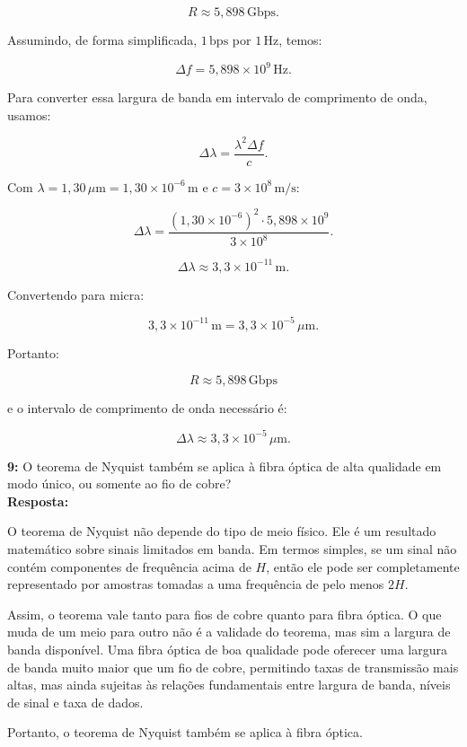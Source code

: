 \documentclass[12pt,a4paper]{report}
\begin{document}
\[
R \approx 5{,}898\,\text{Gbps}.
\]

Assumindo, de forma simplificada, $1\,\text{bps}$ por $1\,\text{Hz}$, temos:

\[
\Delta f = 5{,}898 \times 10^9\,\text{Hz}.
\]

Para converter essa largura de banda em intervalo de comprimento de onda, usamos:

\[
\Delta \lambda = \frac{\lambda^2\Delta f}{c}.
\]

Com $\lambda = 1{,}30\,\mu\text{m} = 1{,}30 \times 10^{-6}\,\text{m}$ e $c = 3 \times 10^8\,\text{m/s}$:

\[
\Delta \lambda = \frac{(1{,}30 \times 10^{-6})^2 \cdot 5{,}898 \times 10^9}{3 \times 10^8}.
\]

\[
\Delta \lambda \approx 3{,}3 \times 10^{-11}\,\text{m}.
\]

Convertendo para micra:

\[
3{,}3 \times 10^{-11}\,\text{m} = 3{,}3 \times 10^{-5}\,\mu\text{m}.
\]

Portanto:

\[
\boxed{R \approx 5{,}898\,\text{Gbps}}
\]

e o intervalo de comprimento de onda necessário é:

\[
\boxed{\Delta \lambda \approx 3{,}3 \times 10^{-5}\,\mu\text{m}}.
\]


\vspace{0.6cm}

\noindent \textbf{9:} O teorema de Nyquist também se aplica à fibra óptica de alta qualidade em modo único, ou somente ao fio de cobre?\\
\textbf{Resposta:}

O teorema de Nyquist não depende do tipo de meio físico. Ele é um resultado matemático sobre sinais limitados em banda. Em termos simples, se um sinal não contém componentes de frequência acima de $H$, então ele pode ser completamente representado por amostras tomadas a uma frequência de pelo menos $2H$.

Assim, o teorema vale tanto para fios de cobre quanto para fibra óptica. O que muda de um meio para outro não é a validade do teorema, mas sim a largura de banda disponível. Uma fibra óptica de boa qualidade pode oferecer uma largura de banda muito maior que um fio de cobre, permitindo taxas de transmissão mais altas, mas ainda sujeitas às relações fundamentais entre largura de banda, níveis de sinal e taxa de dados.

Portanto, o teorema de Nyquist também se aplica à fibra óptica.
\end{document}

